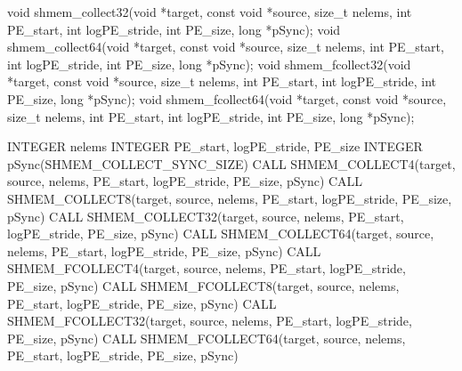 \label{subsec:shmem_collect}
\synC   %

void shmem_collect32(void *target, const void *source, size_t nelems, int PE_start, int logPE_stride, int PE_size, long *pSync);
void shmem_collect64(void *target, const void *source, size_t nelems, int PE_start, int logPE_stride, int PE_size, long *pSync);
void shmem_fcollect32(void *target, const void *source,	size_t nelems, int PE_start, int logPE_stride, int PE_size, long *pSync);
void shmem_fcollect64(void *target, const void *source,	size_t nelems, int PE_start, int logPE_stride, int PE_size, long *pSync); %
\synF   %

INTEGER nelems
INTEGER PE_start, logPE_stride, PE_size
INTEGER pSync(SHMEM_COLLECT_SYNC_SIZE)
CALL SHMEM_COLLECT4(target, source, nelems, PE_start, logPE_stride, PE_size, pSync)
CALL SHMEM_COLLECT8(target, source, nelems, PE_start, logPE_stride, PE_size, pSync)
CALL SHMEM_COLLECT32(target, source, nelems, PE_start, logPE_stride, PE_size, pSync)
CALL SHMEM_COLLECT64(target, source, nelems, PE_start, logPE_stride, PE_size, pSync)
CALL SHMEM_FCOLLECT4(target, source, nelems, PE_start, logPE_stride, PE_size, pSync)
CALL SHMEM_FCOLLECT8(target, source, nelems, PE_start, logPE_stride, PE_size, pSync)
CALL SHMEM_FCOLLECT32(target, source, nelems, PE_start, logPE_stride, PE_size, pSync)
CALL SHMEM_FCOLLECT64(target, source, nelems, PE_start, logPE_stride, PE_size, pSync) %

